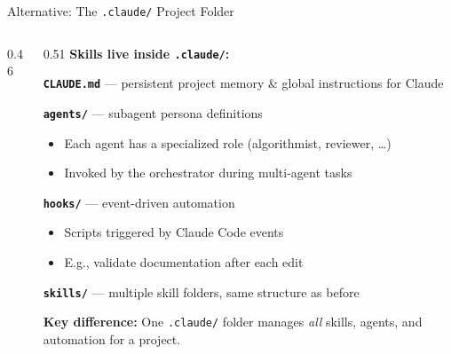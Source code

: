 \documentclass[10pt,english,aspectratio=169]{beamer}
\begin{document}
\begin{frame}[fragile]{Alternative: The \texttt{.claude/} Project Folder}

\begin{columns}[T]
\begin{column}{0.46\textwidth}
\end{column}

\begin{column}{0.51\textwidth}
\textbf{Skills live inside \texttt{.claude/}:}

\vspace{0.2cm}
\textbf{\texttt{CLAUDE.md}} --- persistent project memory \& global instructions for Claude

\vspace{0.2cm}
\textbf{\texttt{agents/}} --- subagent persona definitions
\begin{itemize}
    \item Each agent has a specialized role (algorithmist, reviewer, \ldots)
    \item Invoked by the orchestrator during multi-agent tasks
\end{itemize}

\vspace{0.2cm}
\textbf{\texttt{hooks/}} --- event-driven automation
\begin{itemize}
    \item Scripts triggered by Claude Code events
    \item E.g., validate documentation after each edit
\end{itemize}

\vspace{0.2cm}
\textbf{\texttt{skills/}} --- multiple skill folders, same structure as before

\vspace{0.2cm}
\textbf{Key difference:} One \texttt{.claude/} folder manages \emph{all} skills, agents, and automation for a project.
\end{column}
\end{columns}

\end{frame}
\end{document}
